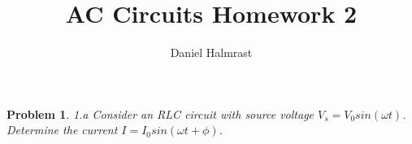 \documentclass[12pt]{article}
\newtheorem{problem}{Problem}
\theoremstyle{definition}
\begin{document}
\title{AC Circuits Homework 2}
\author{Daniel Halmrast}
\maketitle

\begin{problem}{1.a}
Consider an RLC circuit with source voltage $V_s = V_0 sin(\omega t)$.
Determine the current $I = I_0 sin(\omega t + \phi)$.
\end{problem}
\end{document}
